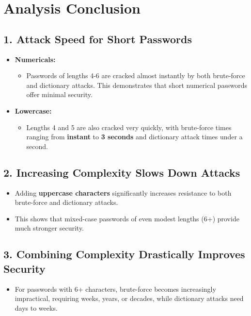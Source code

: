 \documentclass{comjnl}
\begin{document}
\section*{Analysis Conclusion}

\subsection*{1. Attack Speed for Short Passwords}
\begin{itemize}
    \item \textbf{Numericals:} 
    \begin{itemize}
        \item Passwords of lengths 4-6 are cracked almost instantly by both brute-force and dictionary attacks. This demonstrates that short numerical passwords offer minimal security.
    \end{itemize}
    \item \textbf{Lowercase:}
    \begin{itemize}
        \item Lengths 4 and 5 are also cracked very quickly, with brute-force times ranging from \textbf{instant} to \textbf{3 seconds} and dictionary attack times under a second.
    \end{itemize}
\end{itemize}

\subsection*{2. Increasing Complexity Slows Down Attacks}
\begin{itemize}
    \item Adding \textbf{uppercase characters} significantly increases resistance to both brute-force and dictionary attacks.
    \item This shows that mixed-case passwords of even modest lengths (6+) provide much stronger security.
\end{itemize}

\subsection*{3. Combining Complexity Drastically Improves Security}
\begin{itemize}
      \item For passwords with 6+ characters, brute-force becomes increasingly impractical, requiring weeks, years, or decades, while dictionary attacks need days to weeks.
\end{itemize}
\end{document}
